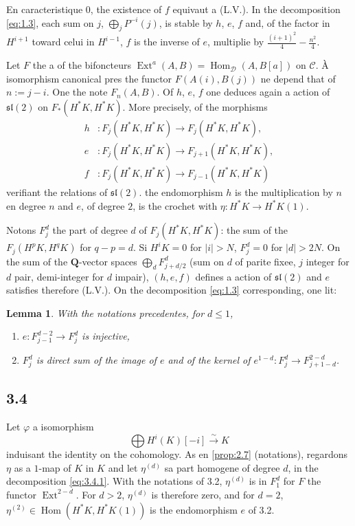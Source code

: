 \documentclass[11pt,a4paper]{article}
\theoremstyle{plain}
\newtheorem{lemma}[theorem]{Lemma}
\theoremstyle{definition}
\DeclareMathOperator{\Ext}{Ext}
\DeclareMathOperator{\Hom}{Hom}
\newcommand{\cD}{\mathscr{D}}
\newcommand{\cC}{\mathscr{C}}
\newcommand{\bQ}{\mathbf{Q}}
\begin{document}
En caracteristique $0$, the existence of $f$ equivaut a (L.V.). In the decomposition \eqref{eq:1.3}, each sum on $j$, $\bigoplus_j P^{-i}(j)$, is stable by $h$, $e$, $f$ and, of the factor in $H^{i+1}$ toward celui in $H^{i-1}$, $f$ is the inverse of $e$, multiplie by $\frac{(i+1)^2}{4} - \frac{n^2}{4}$.

Let $F$ the a of the bifoncteurs $\Ext^a(A,B) = \Hom_{\cD}(A,B[a])$ on $\cC$. \`A isomorphism canonical pres the functor $F(A(i), B(j))$ ne depend that of $n := j-i$. One the note $F_n(A,B)$. Of $h$, $e$, $f$ one deduces again a action of $\mathfrak{sl}(2)$ on $F_*(H^*K, H^*K)$. More precisely, of the morphisms
\begin{align*}
h &\colon F_j(H^*K, H^*K) \to F_j(H^*K, H^*K), \\
e &\colon F_j(H^*K, H^*K) \to F_{j+1}(H^*K, H^*K), \\
f &\colon F_j(H^*K, H^*K) \to F_{j-1}(H^*K, H^*K)
\end{align*}
verifiant the relations of $\mathfrak{sl}(2)$. the endomorphism $h$ is the multiplication by $n$ en degree $n$ and $e$, of degree $2$, is the crochet with $\eta \colon H^*K \to H^*K(1)$.

Notons $F_j^d$ the part of degree $d$ of $F_j(H^*K, H^*K)$: the sum of the $F_j(H^p K, H^q K)$ for $q-p = d$. Si $H^i K = 0$ for $|i| > N$, $F_j^d = 0$ for $|d| > 2N$. On the sum of the $\bQ$-vector spaces $\bigoplus_d F_{j+d/2}^d$ (sum on $d$ of parite fixee, $j$ integer for $d$ pair, demi-integer for $d$ impair), $(h,e,f)$ defines a action of $\mathfrak{sl}(2)$ and $e$ satisfies therefore (L.V.). On the decomposition \eqref{eq:1.3} corresponding, one lit:

\begin{lemma}\label{lem:3.3}
With the notations precedentes, for $d \leqslant 1$,
\begin{enumerate}[label=\textup{(\roman*)}]
\item $e \colon F_{j-1}^{d-2} \to F_j^d$ is injective,
\item $F_j^d$ is direct sum of the image of $e$ and of the kernel of $e^{1-d} \colon F_j^d \to F_{j+1-d}^{2-d}$.
\end{enumerate}
\end{lemma}

\subsection*{3.4}
Let $\varphi$ a isomorphism
\begin{equation}\label{eq:3.4.1}
\bigoplus H^i(K)[-i] \xrightarrow{\sim} K
\end{equation}
induisant the identity on the cohomology. As en \ref{prop:2.7} (notations), regardons $\eta$ as a $1$-map of $K$ in $K$ and let $\eta^{(d)}$ sa part homogene of degree $d$, in the decomposition \eqref{eq:3.4.1}. With the notations of 3.2, $\eta^{(d)}$ is in $F_1^d$ for $F$ the functor $\Ext^{2-d}$. For $d > 2$, $\eta^{(d)}$ is therefore zero, and for $d=2$, $\eta^{(2)} \in \Hom(H^*K, H^*K(1))$ is the endomorphism $e$ of 3.2.
\end{document}
